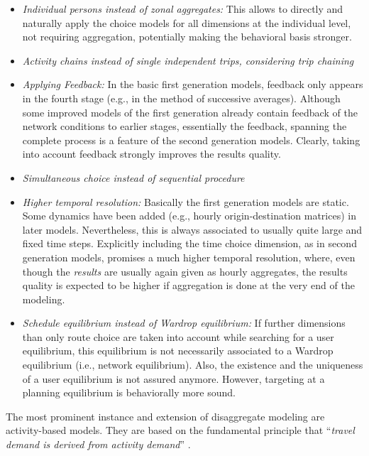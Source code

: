 \begin{spacing}{1.0}
\begin{itemize}
	\item \emph{Individual persons instead of zonal aggregates:} This allows to directly and naturally apply the choice models for all dimensions at the individual level, not requiring aggregation, potentially making the behavioral basis stronger.
	\item \emph{Activity chains instead of single independent trips, considering trip chaining} 
	\item \emph{Applying Feedback:} In the basic first generation models, feedback only appears in the fourth stage (e.g., in the method of successive averages). Although some improved models of the first generation already contain feedback of the network conditions to earlier stages, essentially the feedback, spanning the complete process is a feature of the second generation models. Clearly, taking into account feedback strongly improves the results quality.
	\item \emph{Simultaneous choice instead of sequential procedure}
	\item \emph{Higher temporal resolution:} Basically the first generation models are static. Some dynamics have been added (e.g., hourly origin-destination matrices) in later models. Nevertheless, this is always associated to usually quite large and fixed time steps. Explicitly including the time choice dimension, as in second generation models, promises a much higher temporal resolution, where, even though the \emph{results} are usually again given as hourly aggregates, the results quality is expected to be higher if aggregation is done at the very end of the modeling.
	\item \emph{Schedule equilibrium instead of Wardrop equilibrium:} If further dimensions than only route choice are taken into account while searching for a user equilibrium, this equilibrium is not necessarily associated to a Wardrop equilibrium (i.e., network equilibrium). Also, the existence and the uniqueness of a user equilibrium is not assured anymore. However, targeting at a planning equilibrium is behaviorally more sound.
\end{itemize}
\end{spacing}

The most prominent instance and extension of disaggregate modeling are activity-based models. They are based on the fundamental principle that ``\emph{travel demand is derived from activity demand}'' \citep[][]{Jones_HensherStopher_1979, Bowman_TEC_2009_1, Bowman_TEC_2009_2, BhatKoppelman_HallRW_2003, EttemaTimmermans_1997, BowmanBenAkiva_ABTFCEngelke_1996, BowmanBenAkiva_TransResA_2001}. 

